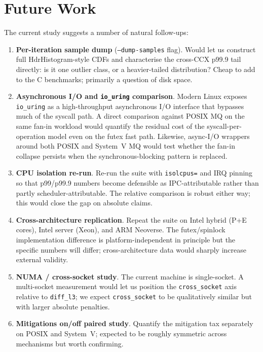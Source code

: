 \documentclass[a4paper,11pt]{article}
\begin{document}
\section{Future Work}
\label{sec:future}

The current study suggests a number of natural follow-ups:

\begin{enumerate}[leftmargin=*]
\item \textbf{Per-iteration sample dump} (\texttt{--dump-samples}
flag). Would let us construct full HdrHistogram-style CDFs and
characterise the cross-CCX p99.9 tail directly: is it one outlier
class, or a heavier-tailed distribution? Cheap to add to the C
benchmarks; primarily a question of disk space.
\item \textbf{Asynchronous I/O and \texttt{io\_uring} comparison}.
Modern Linux exposes \texttt{io\_uring} as a high-throughput
asynchronous I/O interface that bypasses much of the syscall path.
A direct comparison against POSIX MQ on the same fan-in workload
would quantify the residual cost of the syscall-per-operation model
even on the futex fast path. Likewise, async-I/O wrappers around
both POSIX and System~V MQ would test whether the fan-in collapse
persists when the synchronous-blocking pattern is replaced.
\item \textbf{CPU isolation re-run}. Re-run the suite with
\texttt{isolcpus=} and IRQ pinning so that p99/p99.9 numbers become
defensible as IPC-attributable rather than partly scheduler-attributable.
The relative comparison is robust either way; this would close the
gap on absolute claims.
\item \textbf{Cross-architecture replication}. Repeat the suite on
Intel hybrid (P+E cores), Intel server (Xeon), and ARM Neoverse.
The futex/spinlock implementation difference is platform-independent
in principle but the specific numbers will differ; cross-architecture
data would sharply increase external validity.
\item \textbf{NUMA / cross-socket study}. The current machine is
single-socket. A multi-socket measurement would let us position the
\texttt{cross\_socket} axis relative to \texttt{diff\_l3}; we expect
\texttt{cross\_socket} to be qualitatively similar but with larger
absolute penalties.
\item \textbf{Mitigations on/off paired study}. Quantify the
mitigation tax separately on POSIX and System~V; expected to be
roughly symmetric across mechanisms but worth confirming.

\end{enumerate}
\end{document}
